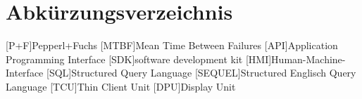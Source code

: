 
\chapter*{Abkürzungsverzeichnis}
\begin{acronym}[slmtA]
    [P+F]{Pepperl+Fuchs}
    [MTBF]{Mean Time Between Failures}
    [API]{Application Programming Interface}
    [SDK]{software development kit}
    [HMI]{Human-Machine-Interface }
    [SQL]{Structured Query Language}
    [SEQUEL]{Structured Englisch Query Language}
    [TCU]{Thin Client Unit}
    [DPU]{Display Unit}
\end{acronym}
